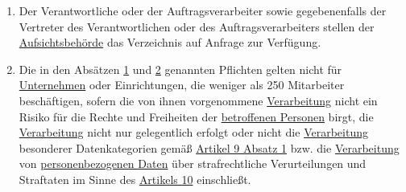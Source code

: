 \begin{enumerate}
  \item Der Verantwortliche oder der Auftragsverarbeiter sowie gegebenenfalls der Vertreter des Verantwortlichen oder
   des Auftragsverarbeiters stellen der \hyperref[itm:04-21]{Aufsichtsbehörde} das Verzeichnis auf Anfrage zur Verfügung.
  \label{itm:30-4}

  \item Die in den Absätzen \hyperref[itm:30-1]{1} und \hyperref[itm:30-2]{2} genannten Pflichten gelten nicht für
   \hyperref[itm:04-18]{Unternehmen} oder Einrichtungen, die weniger als 250 Mitarbeiter beschäftigen, sofern die von ihnen vorgenommene
   \hyperref[itm:04-2]{Verarbeitung} nicht ein Risiko für die Rechte und Freiheiten der \hyperref[itm:04-1]{betroffenen Personen} birgt, die \hyperref[itm:04-2]{Verarbeitung} nicht
   nur gelegentlich erfolgt oder nicht die \hyperref[itm:04-2]{Verarbeitung} besonderer Datenkategorien gemäß \hyperref[itm:09-1]{Artikel 9
   Absatz 1} bzw. die  \hyperref[itm:04-2]{Verarbeitung} von \hyperref[itm:04-1]{personenbezogenen Daten} über strafrechtliche Verurteilungen und Straftaten im
   Sinne des \hyperref[ch:10]{Artikels 10} einschließt.
  \label{itm:30-5}

\end{enumerate}



